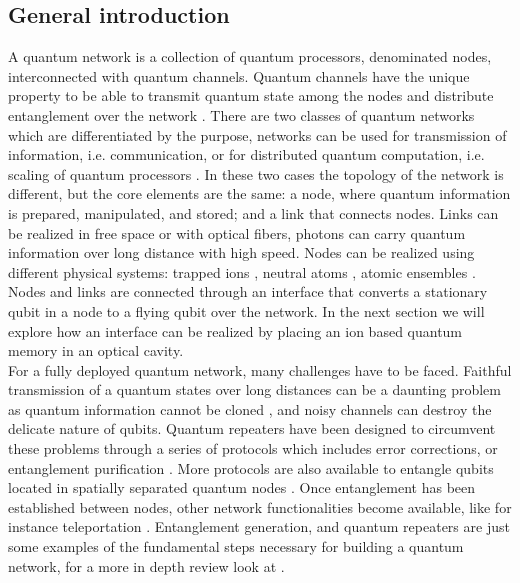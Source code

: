 \subsection{General introduction}
A quantum network is a collection of quantum processors, denominated nodes, interconnected with quantum channels. Quantum channels have the unique property to be able to transmit quantum state among the nodes and distribute entanglement over the network \cite{kimble}. There are two classes of quantum networks which are differentiated by the purpose, networks can be used for transmission of information, i.e. communication, or for distributed quantum computation, i.e. scaling of quantum processors \cite{ion_quantumnetwork}.
In these two cases the topology of the network is different, but the core elements are the same: a node, where quantum information is prepared, manipulated, and stored; and a link that connects nodes. Links can be realized in free space \cite{Hughes2002} or with optical fibers, photons can carry quantum information over long distance with high speed. Nodes can be realized using different physical systems: trapped ions \cite{ion_quantumnetwork}, neutral atoms \cite{Ritter2012}, atomic ensembles \cite{kimble}. Nodes and links are connected through an interface that converts a stationary qubit in a node to a flying qubit over the network.  In the next section we will explore how an interface can be realized by placing an ion based quantum memory in an optical cavity.\\
For a fully deployed quantum network, many challenges have to be faced. Faithful transmission of a quantum states over long distances can be a daunting problem as quantum information cannot be cloned \cite{nocloning}, and noisy channels can destroy the delicate nature of qubits. Quantum repeaters have been designed \cite{quantumrepeters} to circumvent these problems through a series of protocols which includes error corrections, or entanglement purification \cite{Pan2001}. More protocols are also available to  entangle qubits located in spatially separated quantum nodes \cite{Duan2001}. Once entanglement has been established between nodes, other network functionalities become available, like for instance teleportation \cite{PhysRevLett.70.1895}. Entanglement generation, and quantum repeaters are just some examples of the fundamental steps necessary for building a quantum network, for a more in depth review look at \cite{Wehnereaam9288}.


